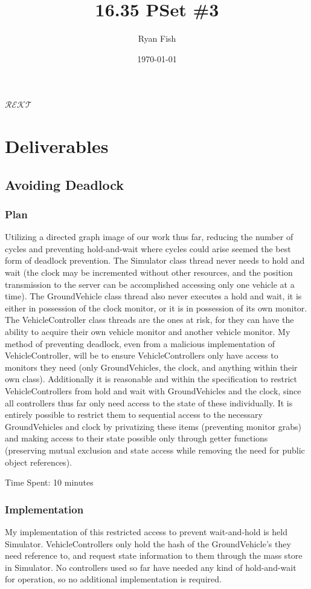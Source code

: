 \documentclass{article}
\title{16.35 PSet \#3}
\author{Ryan Fish}
\date{\today}
\begin{document}
\maketitle

$\mathcal{REKT}$

\section{Deliverables}
\subsection{Avoiding Deadlock}
\subsubsection{Plan}
Utilizing a directed graph image of our work thus far, reducing the number of cycles and preventing hold-and-wait where cycles could arise seemed the best form of deadlock prevention.  The Simulator class thread never needs to hold and wait (the clock may be incremented without other resources, and the position transmission to the server can be accomplished accessing only one vehicle at a time).  The GroundVehicle class thread also never executes a hold and wait, it is either in possession of the clock monitor, or it is in possession of its own monitor.  The VehicleController class threads are the ones at risk, for they can have the ability to acquire their own vehicle monitor and another vehicle monitor.  My method of preventing deadlock, even from a malicious implementation of VehicleController, will be to ensure VehicleControllers only have access to monitors they need (only GroundVehicles, the clock, and anything within their own class).  Additionally it is reasonable and within the specification to restrict VehicleControllers from hold and wait with GroundVehicles and the clock, since all controllers thus far only need access to the state of these individually. It is entirely possible to restrict them to sequential access to the necessary GroundVehicles and clock by privatizing these items (preventing monitor grabs) and making access to their state possible only through getter functions (preserving mutual exclusion and state access while removing the need for public object references).

Time Spent: 10 minutes

\subsubsection{Implementation}
My implementation of this restricted access to prevent wait-and-hold is held Simulator.  VehicleControllers only hold the hash of the GroundVehicle's they need reference to, and request state information to them through the mass store in Simulator.  No controllers used so far have needed any kind of hold-and-wait for operation, so no additional implementation is required.
\end{document}
